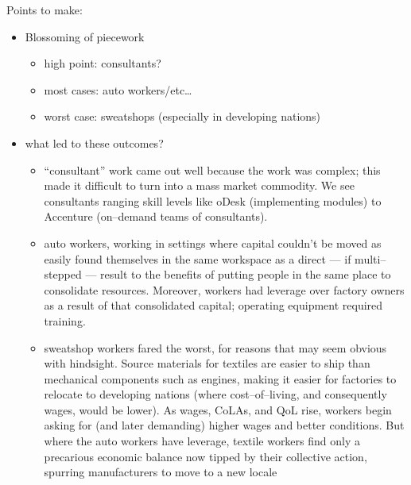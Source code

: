 \documentclass[trackingWork]{subfiles}
\begin{document}
Points to make:
  \begin{itemize}
    \item Blossoming of piecework
    \begin{itemize}
      \item high point: consultants?
      \item most cases: auto workers/etc\dots
      \item worst case: sweatshops (especially in developing nations)
    \end{itemize}
    \item what led to these outcomes?
    \begin{itemize}
      \item ``consultant'' work came out well because the work was complex;
      this made it difficult to turn into a mass market commodity.
      We see consultants ranging skill levels like
      oDesk (implementing modules) to
      Accenture (on--demand teams of consultants).
      \item auto workers,
      working in settings where capital couldn't be moved as easily
      found themselves in the same workspace as a direct
      --- if multi--stepped ---
      result to the benefits of putting people in the same place to consolidate resources.
      Moreover,
      workers had leverage over factory owners as a result of that consolidated capital;
      operating equipment required training.
      \item sweatshop workers fared the worst,
      for reasons that may seem obvious with hindsight.
      Source materials for textiles are easier to ship than mechanical components such as engines,
      making it easier for factories to relocate to developing nations
      (where cost--of--living, and consequently wages, would be lower).
      As wages, CoLAs, and QoL rise, workers begin asking for
      (and later demanding)
      higher wages and better conditions.
      But where the auto workers have leverage,
      textile workers find only a precarious economic balance now tipped by their collective action,
      spurring manufacturers to move to a new locale
    \end{itemize}
  \end{itemize}
\end{document}
